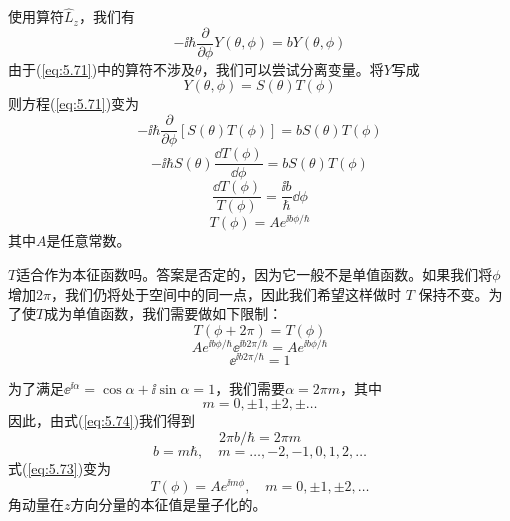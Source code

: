     使用算符$\hat{L}_z$，我们有
    \begin{equation}
        -\ii \hbar\frac{\partial}{\partial \phi}Y\left(\theta,\phi\right) = bY\left(\theta,\phi\right)
        \label{eq:5.71}
    \end{equation}
    由于(\ref{eq:5.71})中的算符不涉及$\theta$，我们可以尝试分离变量。将$Y$写成
    \begin{equation}
        Y\left(\theta,\phi\right) = S\left(\theta\right)T\left(\phi\right)
        \label{eq:5.72}
    \end{equation}
    则方程(\ref{eq:5.71})变为
    \begin{equation*}
        -\ii \hbar\frac{\partial}{\partial \phi}\left[S\left(\theta\right)T\left(\phi\right)\right] = bS\left(\theta\right)T\left(\phi\right)
    \end{equation*}
    \begin{equation*}
        -\ii \hbar S\left(\theta\right)\frac{\dd T\left(\phi\right)}{\dd \phi} = bS\left(\theta\right)T\left(\phi\right)
    \end{equation*}
    \begin{equation*}
        \frac{\dd T\left(\phi\right)}{T\left(\phi\right)} = \frac{\ii b}{\hbar}\dd \phi
    \end{equation*}
    \begin{equation}
        T\left(\phi\right) = A e^{\ii b\phi/\hbar}
        \label{eq:5.73}
    \end{equation}
    其中$A$是任意常数。

    $T$适合作为本征函数吗。答案是否定的，因为它一般不是单值函数。如果我们将$\phi$增加$2\pi$，我们仍将处于空间中的同一点，因此我们希望这样做时 $T$ 保持不变。为了使$T$成为单值函数，我们需要做如下限制：
    \begin{equation*}
        T\left(\phi + 2\pi\right) = T\left(\phi\right)
    \end{equation*}
    \begin{equation*}
        A e^{\ii b\phi/\hbar}\ee ^{\ii b2\pi/\hbar} = A e^{\ii b\phi/\hbar}
    \end{equation*}
    \begin{equation}
        \ee ^{\ii b2\pi/\hbar} = 1
        \label{eq:5.74}
    \end{equation}

    为了满足$\ee ^{\ii \alpha} = \cos\alpha + \ii \sin\alpha = 1$，我们需要$\alpha = 2\pi m$，其中
    \begin{equation*}
        m = 0, \pm 1, \pm 2, \pm\ldots
    \end{equation*}
    因此，由式(\ref{eq:5.74})我们得到
    \begin{equation*}
        2\pi b/\hbar = 2\pi m
    \end{equation*}
    \begin{equation}
        b = m\hbar, \quad m = \ldots, -2, -1, 0, 1, 2, \ldots
        \label{eq:5.75}
    \end{equation}
    式(\ref{eq:5.73})变为
    \begin{equation}
        T\left(\phi\right) = A e^{\ii m\phi}, \quad m = 0, \pm 1, \pm 2, \ldots
        \label{eq:5.76}
    \end{equation}
    角动量在$z$方向分量的本征值是量子化的。

